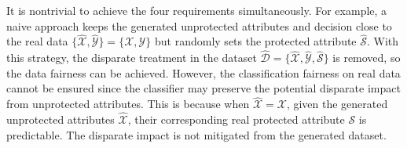 \documentclass[sigconf]{acmart}
\theoremstyle{definition}
\newcommand\independent{\protect\mathpalette{\protect\independenT}{\perp}}
\def\independenT#1#2{\mathrel{\rlap{$#1#2$}\mkern2mu{#1#2}}}
\begin{document}

It is nontrivial to achieve the four requirements simultaneously. For example, a naive approach keeps the generated unprotected attributes and decision close to the real data $\{\hat{\mathcal{X}}, \hat{\mathcal{Y}}\} = \{\mathcal{X}, \mathcal{Y}\}$ but randomly sets the protected attribute $\hat{\mathcal{S}}$. With this strategy, the disparate treatment in the dataset $\hat{\mathcal{D}} = \{\hat{\mathcal{X}}, \hat{\mathcal{Y}}, \hat{\mathcal{S}}\}$ is removed, so the data fairness can be achieved. However, the classification fairness on real data cannot be ensured since the classifier may preserve the potential disparate impact from unprotected attributes. This is because when $\hat{\mathcal{X}} = \mathcal{X}$, given the generated unprotected attributes $\hat{\mathcal{X}}$, their corresponding real protected attribute $\mathcal{S}$ is predictable. The disparate impact is not mitigated from the generated dataset.

\end{document}
